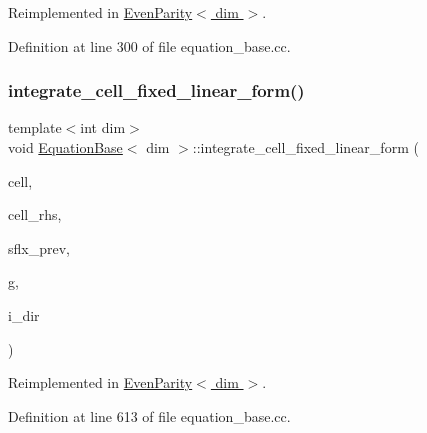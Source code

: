 Reimplemented in \hyperlink{class_even_parity_adb381ea4f45e5ae3741b1d30a0de02b6}{Even\+Parity$<$ dim $>$}.



Definition at line 300 of file equation\+\_\+base.\+cc.

\mbox{\label{class_equation_base_ae8472f5c20d76c7d01e5660f8377887e}} 
\subsubsection{\texorpdfstring{integrate\+\_\+cell\+\_\+fixed\+\_\+linear\+\_\+form()}{integrate\_cell\_fixed\_linear\_form()}}
{\footnotesize\ttfamily template$<$int dim$>$ \\
void \hyperlink{class_equation_base}{Equation\+Base}$<$ dim $>$\+::integrate\+\_\+cell\+\_\+fixed\+\_\+linear\+\_\+form (\begin{DoxyParamCaption}\item[{typename Do\+F\+Handler$<$ dim $>$\+::active\+\_\+cell\+\_\+iterator \&}]{cell,  }\item[{Vector$<$ double $>$ \&}]{cell\+\_\+rhs,  }\item[{std\+::vector$<$ Vector$<$ double $>$ $>$ \&}]{sflx\+\_\+prev,  }\item[{const unsigned int \&}]{g,  }\item[{const unsigned int \&}]{i\+\_\+dir }\end{DoxyParamCaption})\hspace{0.3cm}{\ttfamily [virtual]}}



Reimplemented in \hyperlink{class_even_parity_a5efaf943f1bde0b3f9a62ea8f5dc5ff0}{Even\+Parity$<$ dim $>$}.



Definition at line 613 of file equation\+\_\+base.\+cc.

\mbox{\label{class_equation_base_af56caa04c80d8f388e116307930d0063}} 
